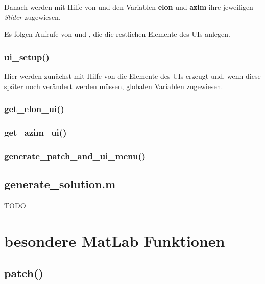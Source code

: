 \documentclass[a4paper,12pt]{scrartcl}
\begin{document}
        Danach werden mit Hilfe von \textbf{} und \textbf{} den Variablen \textbf{elon} und \textbf{azim} ihre jeweiligen \emph{Slider} zugewiesen.

        Es folgen Aufrufe von \textbf{} und \textbf{}, die die restlichen Elemente des UIs anlegen.

      \subsubsection{ui\_setup()}\label{sec:uiSetup}
        Hier werden zunächst mit Hilfe von \textbf{} die Elemente des UIs erzeugt und, wenn diese später noch verändert werden müssen, globalen Variablen zugewiesen.


      \subsubsection{get\_elon\_ui()}\label{sec:elonUI}

      \subsubsection{get\_azim\_ui()}\label{sec:azimUI}

      \subsubsection{generate\_patch\_and\_ui\_menu()}\label{sec:generatePatches}


\newpage
    \subsection{generate\_solution.m}\label{sec:aufbau2}
      \Large{TODO}


  \section{besondere MatLab Funktionen}
    \subsection{patch()}\label{sec:patch}
\end{document}
